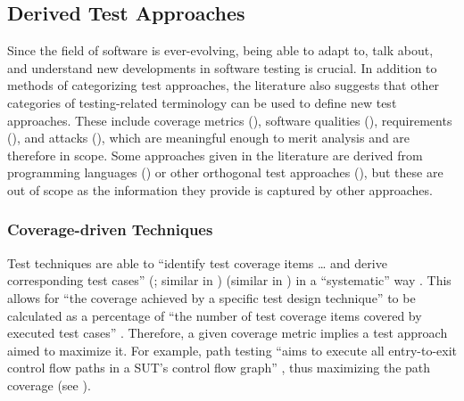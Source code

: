     \subsection{Derived Test Approaches}
    \label{derived-tests}

    Since the field of software is ever-evolving, being able to adapt to,
    talk about, and understand new developments in software testing is
    crucial. In addition to methods of categorizing test approaches, the
    literature also suggests that other categories of testing-related
    terminology can be used to define new test approaches. These include
    coverage metrics (), software qualities (),
    requirements (), and attacks (), which are
    meaningful enough to merit analysis and are therefore in scope. Some
    approaches given in the literature are derived from programming languages
    () or other orthogonal test approaches (),
    but these are out of scope as the information they provide is captured by
    other approaches.

    \subsubsection{Coverage-driven Techniques}
    \label{cov-test}

    Test techniques are able to ``identify test coverage items \dots{} and
    derive corresponding test cases''
    \ifnotpaper
        (\citealp[p.~11]{IEEE2022}; similar in \citeyear[p.~467]{IEEE2017})
    \else
        \cite[p.~11]{IEEE2022} (similar in \cite[p.~467]{IEEE2017})
    \fi
    in a ``systematic'' way
    \citeyearpar[p.~464]{IEEE2017}.
    \ifnotpaper
        This allows for ``the coverage achieved by a specific test design
        technique'' to be calculated as a percentage of ``the number of test
        coverage items covered by executed test cases'' \citeyearpar[p.~30]{IEEE2021}.
    \fi %
    Therefore, a given coverage metric implies a test approach aimed to
    maximize it. For example, path testing ``aims to execute all entry-to-exit
    control flow paths in a SUT's control flow graph'' \citep[p.~5013]{SWEBOK2024},
    thus maximizing the path coverage
    \ifnotpaper
        \citep[see][Fig.~1]{SharmaEtAl2021}\else
        (see \cite[Fig.~1]{SharmaEtAl2021})\fi.

